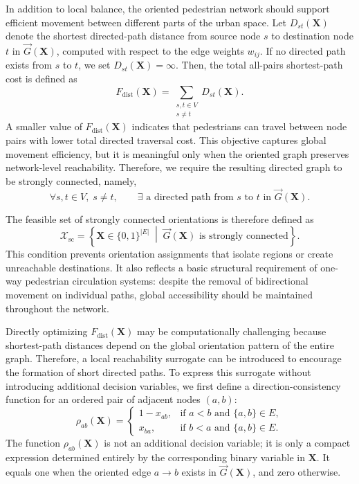 \documentclass[twocolumn,a4paper]{article} %
\begin{document}
In addition to local balance, the oriented pedestrian network should support efficient movement between different parts of the urban space. Let \(D_{st}(\mathbf{X})\) denote the shortest directed-path distance from source node \(s\) to destination node \(t\) in \(\vec{G}(\mathbf{X})\), computed with respect to the edge weights \(w_{ij}\). If no directed path exists from \(s\) to \(t\), we set $ D_{st}(\mathbf{X})=\infty$.
Then, the total all-pairs shortest-path cost is defined as
\begin{equation}
    F_{\mathrm{dist}}(\mathbf{X})
    =
    \sum_{\substack{s,t\in V\\s\neq t}}
    D_{st}(\mathbf{X}).
\end{equation}
A smaller value of \(F_{\mathrm{dist}}(\mathbf{X})\) indicates that pedestrians can travel between node pairs with lower total directed traversal cost. This objective captures global movement efficiency, but it is meaningful only when the oriented graph preserves network-level reachability. Therefore, we require the resulting directed graph to be strongly connected, namely,
\begin{equation}
    \forall s,t\in V,\; s\neq t,
    \qquad
    \exists \text{ a directed path from } s \text{ to } t
    \text{ in } \vec{G}(\mathbf{X}).
\end{equation}

The feasible set of strongly connected orientations is therefore defined as
\begin{equation}
    \mathcal{X}_{\mathrm{sc}}
    =
    \left\{
    \mathbf{X}\in\{0,1\}^{|E|}
    \;\middle|\;
    \vec{G}(\mathbf{X}) \text{ is strongly connected}
    \right\}.
\end{equation}
This condition prevents orientation assignments that isolate regions or create unreachable destinations. It also reflects a basic structural requirement of one-way pedestrian circulation systems: despite the removal of bidirectional movement on individual paths, global accessibility should be maintained throughout the network.

Directly optimizing \(F_{\mathrm{dist}}(\mathbf{X})\) may be computationally challenging because shortest-path distances depend on the global orientation pattern of the entire graph. Therefore, a local reachability surrogate can be introduced to encourage the formation of short directed paths. To express this surrogate without introducing additional decision variables, we first define a direction-consistency function for an ordered pair of adjacent nodes \((a,b)\):
\begin{equation}
    \rho_{ab}(\mathbf{X})
    =
    \begin{cases}
    1-x_{ab}, & \text{if } a<b \text{ and } \{a,b\}\in E,\\
    x_{ba}, & \text{if } b<a \text{ and } \{a,b\}\in E.
    \end{cases}
\end{equation}
The function \(\rho_{ab}(\mathbf{X})\) is not an additional decision variable; it is only a compact expression determined entirely by the corresponding binary variable in \(\mathbf{X}\). It equals one when the oriented edge \(a\rightarrow b\) exists in \(\vec{G}(\mathbf{X})\), and zero otherwise.
\end{document}
